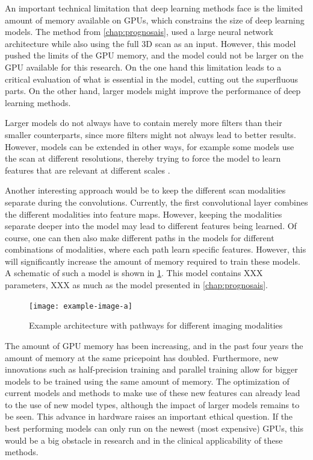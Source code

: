 An important technical limitation that deep learning methods face is the limited amount of memory available on GPUs, which constrains the size of deep learning models.
The method from \cref{chap:prognosais}, used a large neural network architecture while also using the full 3D scan as an input.
However, this model pushed the limits of the GPU memory, and the model could not be larger on the GPU available for this research.
On the one hand this limitation leads to a critical evaluation of what is essential in the model, cutting out the superfluous parts.
On the other hand, larger models might improve the performance of deep learning methods.

Larger models do not always have to contain merely more filters than their smaller counterparts, since more filters might not always lead to better results.
However, models can be extended in other ways, for example some models use the scan at different resolutions, thereby trying to force the model to learn features that are relevant at different scales \autocite{akkus20171p19q}.

Another interesting approach would be to keep the different scan modalities separate during the convolutions.
Currently, the first convolutional layer combines the different modalities into feature maps.
However, keeping the modalities separate deeper into the model may lead to different features being learned.
Of course, one can then also make different paths in the models for different combinations of modalities, where each path learn specific features.
However, this will significantly increase the amount of memory required to train these models.
A schematic of such a model is shown in \cref{fig:discussion_architecture}.
This model contains XXX parameters, XXX as much as the model presented in \cref{chap:prognosais}.

\begin{figure}
\texttt{[image: example-image-a]}
\caption{Example architecture with pathways for different imaging modalities}\label{fig:discussion_architecture}
\end{figure}

The amount of GPU memory has been increasing, and in the past four years the amount of memory at the same pricepoint has doubled.
Furthermore, new innovations such as half-precision training and parallel training allow for bigger models to be trained using the same amount of memory.
The optimization of current models and methods to make use of these new features can already lead to the use of new model types, although the impact of larger models remains to be seen.
This advance in hardware raises an important ethical question.
If the best performing models can only run on the newest (most expensive) GPUs, this would be a big obstacle in research and in the clinical applicability of these methods.


